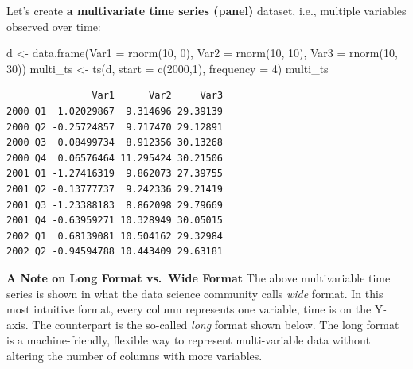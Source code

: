 \documentclass[
  12pt,
  letterpaper,
]{krantz}
\newenvironment{Shaded}{\begin{snugshade}}{\end{snugshade}}
\newcommand{\AttributeTok}[1]{\textcolor[rgb]{0.40,0.45,0.13}{#1}}
\newcommand{\DecValTok}[1]{\textcolor[rgb]{0.68,0.00,0.00}{#1}}
\newcommand{\FunctionTok}[1]{\textcolor[rgb]{0.28,0.35,0.67}{#1}}
\newcommand{\NormalTok}[1]{\textcolor[rgb]{0.00,0.23,0.31}{#1}}
\newcommand{\OtherTok}[1]{\textcolor[rgb]{0.00,0.23,0.31}{#1}}
\begin{document}
\normalsize

Let's create \textbf{a multivariate time series
(panel)} dataset, i.e., multiple variables observed over time:

\normalsize

\begin{Shaded}
\begin{Highlighting}[]
\NormalTok{d }\OtherTok{\textless{}{-}} \FunctionTok{data.frame}\NormalTok{(}\AttributeTok{Var1 =} \FunctionTok{rnorm}\NormalTok{(}\DecValTok{10}\NormalTok{, }\DecValTok{0}\NormalTok{),}
           \AttributeTok{Var2 =} \FunctionTok{rnorm}\NormalTok{(}\DecValTok{10}\NormalTok{, }\DecValTok{10}\NormalTok{),}
           \AttributeTok{Var3 =} \FunctionTok{rnorm}\NormalTok{(}\DecValTok{10}\NormalTok{, }\DecValTok{30}\NormalTok{))}
\NormalTok{multi\_ts }\OtherTok{\textless{}{-}} \FunctionTok{ts}\NormalTok{(d, }\AttributeTok{start =} \FunctionTok{c}\NormalTok{(}\DecValTok{2000}\NormalTok{,}\DecValTok{1}\NormalTok{), }\AttributeTok{frequency =} \DecValTok{4}\NormalTok{)}
\NormalTok{multi\_ts}
\end{Highlighting}
\end{Shaded}

\begin{verbatim}
               Var1      Var2     Var3
2000 Q1  1.02029867  9.314696 29.39139
2000 Q2 -0.25724857  9.717470 29.12891
2000 Q3  0.08499734  8.912356 30.13268
2000 Q4  0.06576464 11.295424 30.21506
2001 Q1 -1.27416319  9.862073 27.39755
2001 Q2 -0.13777737  9.242336 29.21419
2001 Q3 -1.23388183  8.862098 29.79669
2001 Q4 -0.63959271 10.328949 30.05015
2002 Q1  0.68139081 10.504162 29.32984
2002 Q2 -0.94594788 10.443409 29.63181
\end{verbatim}

\normalsize

\begin{tcolorbox}[enhanced jigsaw, colback=white, leftrule=.75mm, breakable, colframe=quarto-callout-note-color-frame, bottomrule=.15mm, arc=.35mm, opacityback=0, rightrule=.15mm, toprule=.15mm, left=2mm]
\begin{minipage}[t]{5.5mm}
\textcolor{quarto-callout-note-color}{\faInfo}
\end{minipage}%
\begin{minipage}[t]{\textwidth - 5.5mm}

\textbf{A Note on Long Format vs.~Wide Format} The above multivariable
time series is shown in what the data science
community calls \emph{wide} format. In this most
intuitive format, every column represents one variable, time is on the
Y-axis. The counterpart is the so-called \emph{long} format shown below.
The long format is a machine-friendly, flexible way
to represent multi-variable data without altering the number of columns
with more variables.

\end{minipage}%
\end{tcolorbox}
\end{document}

